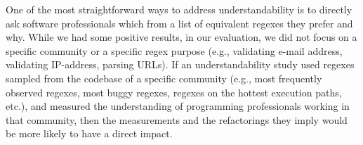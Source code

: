 One of the most straightforward ways to address understandability is to directly ask software professionals which from a list of equivalent regexes they prefer and why.
While we had some positive results, in our evaluation, we did not focus on a specific community or a specific regex purpose (e.g., validating e-mail address, validating IP-address, parsing URLs). 
 If an understandability study used regexes sampled from the codebase of a specific community (e.g., most frequently observed regexes, most buggy regexes, regexes on the hottest execution paths, etc.), and measured the understanding of programming professionals working in that community, then the measurements and the refactorings they imply would be more likely to have a direct impact.
%

